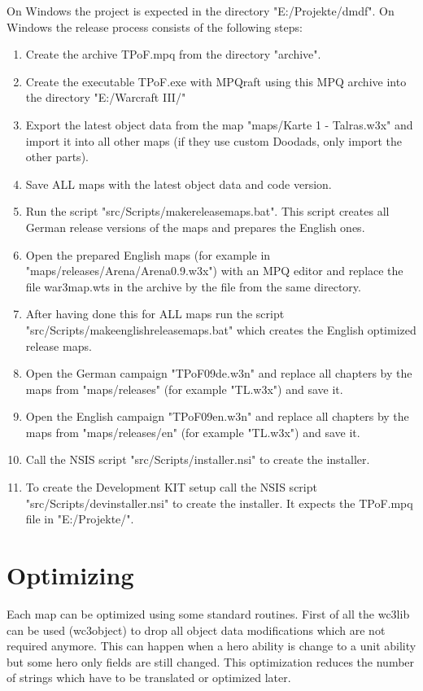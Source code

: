 \documentclass[a4paper,12pt,titlepage]{report}
\begin{document}
\vspace{\baselineskip}

On Windows the project is expected in the directory "E:/Projekte/dmdf".
On Windows the release process consists of the following steps:
\begin{enumerate}
\item Create the archive TPoF.mpq from the directory "archive".
\item Create the executable TPoF.exe with MPQraft using this MPQ archive into the directory "E:/Warcraft III/"
\item Export the latest object data from the map "maps/Karte 1 - Talras.w3x" and import it into all other maps (if they use custom Doodads, only import the other parts).
\item Save ALL maps with the latest object data and code version.
\item Run the script "src/Scripts/makereleasemaps.bat". This script creates all German release versions of the maps and prepares the English ones.
\item Open the prepared English maps (for example in "maps/releases/Arena/Arena0.9.w3x") with an MPQ editor and replace the file war3map.wts in the archive by the file from the same directory.
\item After having done this for ALL maps run the script "src/Scripts/makeenglishreleasemaps.bat" which creates the English optimized release maps.
\item Open the German campaign "TPoF09de.w3n" and replace all chapters by the maps from "maps/releases" (for example "TL.w3x") and save it.
\item Open the English campaign "TPoF09en.w3n" and replace all chapters by the maps from "maps/releases/en" (for example "TL.w3x") and save it.
\item Call the NSIS script "src/Scripts/installer.nsi" to create the installer.
\item To create the Development KIT setup call the NSIS script "src/Scripts/devinstaller.nsi" to create the installer. It expects the TPoF.mpq file in "E:/Projekte/".
\end{enumerate}

\section{Optimizing}

Each map can be optimized using some standard routines. First of all the wc3lib can be used (wc3object) to drop all object data modifications which are not required anymore. This can happen when a hero ability is change to a unit ability but some hero only fields are still changed. This optimization reduces the number of strings which have to be translated or optimized later.
\end{document}
